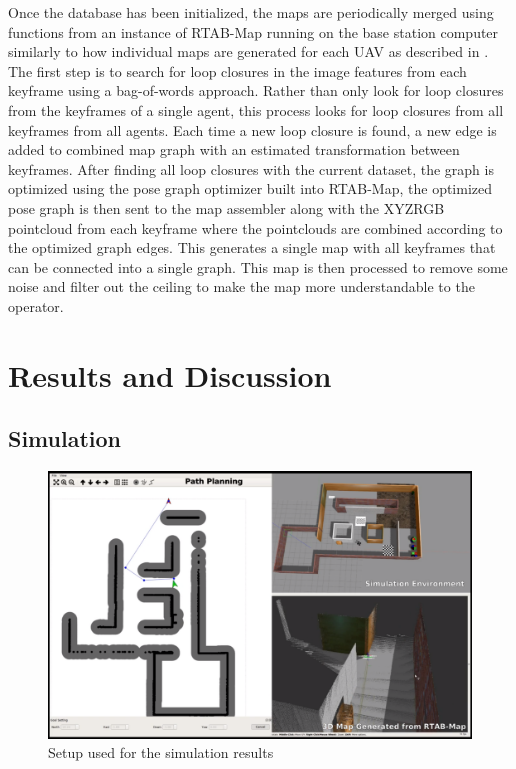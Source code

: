\documentclass[letterpaper, 10 pt, conference]{ieeeconf}  %
\begin{document}
Once the database has been initialized, the maps are periodically merged using functions from an instance of RTAB-Map running on the base station computer similarly to how individual maps are generated for each UAV as described in \cite{Labbe2011}\cite{Labbe2013}\cite{Labbe2019}. The first step is to search for loop closures in the image features from each keyframe using a bag-of-words approach. Rather than only look for loop closures from the keyframes of a single agent, this process looks for loop closures from all keyframes from all agents. Each time a new loop closure is found, a new edge is added to combined map graph with an estimated transformation between keyframes. After finding all loop closures with the current dataset, the graph is optimized using the pose graph optimizer built into RTAB-Map, the optimized pose graph is then sent to the map assembler along with the XYZRGB pointcloud from each keyframe where the pointclouds are combined according to the optimized graph edges. This generates a single map with all keyframes that can be connected into a single graph. This map is then processed to remove some noise and filter out the ceiling to make the map more understandable to the operator.
\section{Results and Discussion}\label{results}

\subsection{Simulation}

\begin{figure}
\centering
\includegraphics[width=1.0\linewidth]{sim_setup}
\caption{Setup used for the simulation results}
\label{fig:sim_setup}
\end{figure}
\end{document}
